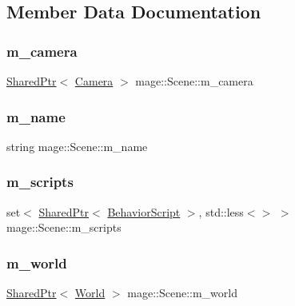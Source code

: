 \subsection{Member Data Documentation}
\hypertarget{classmage_1_1_scene_a961c280659f9934441d8e835508e933d}{}\label{classmage_1_1_scene_a961c280659f9934441d8e835508e933d} 
\subsubsection{\texorpdfstring{m\+\_\+camera}{m\_camera}}
{\footnotesize\ttfamily \hyperlink{namespacemage_a1e01ae66713838a7a67d30e44c67703e}{Shared\+Ptr}$<$ \hyperlink{classmage_1_1_camera}{Camera} $>$ mage\+::\+Scene\+::m\+\_\+camera\hspace{0.3cm}{\ttfamily [private]}}

\hypertarget{classmage_1_1_scene_a6cc8cb08b1853c4e3063b33a94e8fb47}{}\label{classmage_1_1_scene_a6cc8cb08b1853c4e3063b33a94e8fb47} 
\subsubsection{\texorpdfstring{m\+\_\+name}{m\_name}}
{\footnotesize\ttfamily string mage\+::\+Scene\+::m\+\_\+name\hspace{0.3cm}{\ttfamily [private]}}

\hypertarget{classmage_1_1_scene_a74ad0b8c6b085bd519de33da51ebb8dd}{}\label{classmage_1_1_scene_a74ad0b8c6b085bd519de33da51ebb8dd} 
\subsubsection{\texorpdfstring{m\+\_\+scripts}{m\_scripts}}
{\footnotesize\ttfamily set$<$ \hyperlink{namespacemage_a1e01ae66713838a7a67d30e44c67703e}{Shared\+Ptr}$<$ \hyperlink{classmage_1_1_behavior_script}{Behavior\+Script} $>$, std\+::less$<$$>$ $>$ mage\+::\+Scene\+::m\+\_\+scripts\hspace{0.3cm}{\ttfamily [private]}}

\hypertarget{classmage_1_1_scene_ab03b79c8ae30602fea1fabb84927a829}{}\label{classmage_1_1_scene_ab03b79c8ae30602fea1fabb84927a829} 
\subsubsection{\texorpdfstring{m\+\_\+world}{m\_world}}
{\footnotesize\ttfamily \hyperlink{namespacemage_a1e01ae66713838a7a67d30e44c67703e}{Shared\+Ptr}$<$ \hyperlink{classmage_1_1_world}{World} $>$ mage\+::\+Scene\+::m\+\_\+world\hspace{0.3cm}{\ttfamily [private]}}

